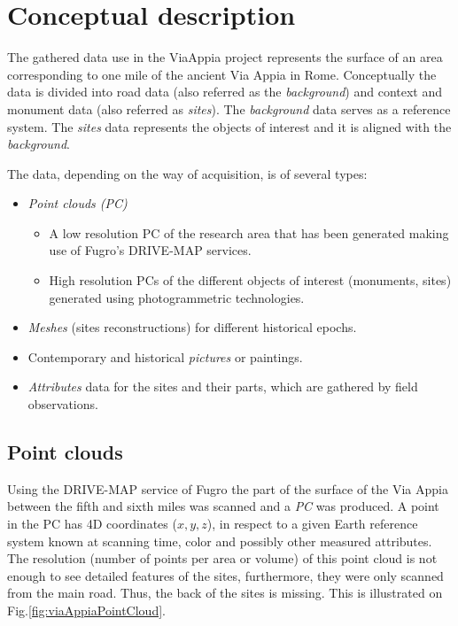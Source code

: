 \section{Conceptual description} \label{sec:concept_descr}

The gathered data use in the ViaAppia project represents the surface of an area
corresponding to one mile of the ancient Via Appia in Rome. Conceptually the
data is divided into road data (also referred as the {\em background}) and
context and monument data (also referred as {\em sites}). The {\em background}
data serves as a reference system. The {\em sites} data represents the objects
of interest and it is aligned with the {\em background}.

The data, depending on the way of acquisition, is of several types:
\begin{itemize} 
\item {\em Point clouds (PC)}
    \begin{itemize} 
    \item A low resolution PC of the research area that has been generated making
    use of Fugro's DRIVE-MAP services.
    \item High resolution PCs of the different objects of interest (monuments,
    sites) generated using photogrammetric technologies.
    \end{itemize}
\item {\em Meshes} (sites reconstructions) for different historical epochs.
\item Contemporary and historical {\em pictures} or paintings.
\item {\em Attributes} data for the sites and their parts, which are gathered
by field observations.
\end{itemize}

\subsection{Point clouds}
Using the DRIVE-MAP service of Fugro the part of the
surface of the Via Appia between the fifth and sixth miles was scanned and a
{\em PC} was produced. A point in the PC has 4D coordinates ($x, y, z$), in
respect to a given Earth reference system known at scanning time, color and
possibly other measured attributes. The resolution (number of points per area
or volume) of this point cloud is not enough to see detailed features of the
sites, furthermore, they were only scanned from the main road. Thus, the back
of the sites is missing. This is illustrated on Fig.\ref{fig:viaAppiaPointCloud}.

